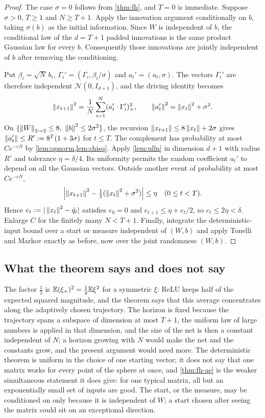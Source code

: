 \begin{proof}
The case $\sigma=0$ follows from \cref{thm:fh}, and $T=0$ is immediate. Suppose $\sigma>0$, $T\ge1$ and $N\ge T+1$. Apply the innovation argument conditionally on $b$, taking $\sigma(b)$ as the initial information. Since $W$ is independent of $b$, the conditional law of the $d=T+1$ padded innovations is the same product Gaussian law for every $b$. Consequently those innovations are jointly independent of $b$ after removing the conditioning.

Put $\beta_i=\sqrt N\,b_i$, $\Gamma_i'=(\Gamma_i,\beta_i/\sigma)$ and $a_t'=(a_t,\sigma)$. The vectors $\Gamma_i'$ are therefore independent $\mathcal N(0,I_{d+1})$, and the driving identity becomes
\[
\left\lVert x_{t+1}\right\rVert^2=\frac1N\sum_{i=1}^N(a_t'\cdot\Gamma_i')_+^2,
\qquad \left\lVert a_t'\right\rVert^2=\left\lVert x_t\right\rVert^2+\sigma^2.
\]
On $\{\left\lVert W\right\rVert_{2\to 2}\le8,\ \left\lVert b\right\rVert^2\le2\sigma^2\}$, the recursion $\left\lVert x_{t+1}\right\rVert\le8\left\lVert x_t\right\rVert+2\sigma$ gives $\left\lVert a_t'\right\rVert\le R':=8^T(1+3\sigma)$ for $t\le T$. The complement has probability at most $Ce^{-cN}$ by \cref{lem:opnorm,lem:chisq}. Apply \cref{lem:ulln} in dimension $d+1$ with radius $R'$ and tolerance $\eta=\delta/4$. Its uniformity permits the random coefficient $a_t'$ to depend on all the Gaussian vectors. Outside another event of probability at most $Ce^{-cN}$,
\[
\left|\left\lVert x_{t+1}\right\rVert^2-\tfrac12(\left\lVert x_t\right\rVert^2+\sigma^2)\right|\le\eta
\quad(0\le t<T).
\]
Hence $e_t:=|\left\lVert x_t\right\rVert^2-\bar q_t|$ satisfies $e_0=0$ and $e_{t+1}\le\eta+e_t/2$, so $e_t\le2\eta<\delta$. Enlarge $C$ for the finitely many $N<T+1$. Finally, integrate the deterministic-input bound over a start or measure independent of $(W,b)$ and apply Tonelli and Markov exactly as before, now over the joint randomness $(W,b)$.
\end{proof}

\subsection{What the theorem says and does not say}

The factor $\tfrac12$ is $\mathbb{E}(\xi_+)^2=\tfrac12\mathbb{E}\xi^2$ for a symmetric $\xi$: ReLU keeps half of the expected squared magnitude, and the theorem says that this average concentrates along the adaptively chosen trajectory. The horizon is fixed because the trajectory spans a subspace of dimension at most $T+1$, the uniform law of large numbers is applied in that dimension, and the size of the net is then a constant independent of $N$; a horizon growing with $N$ would make the net and the constants grow, and the present argument would need more. The deterministic theorem is uniform in the choice of one starting vector; it does not say that one matrix works for every point of the sphere at once, and \cref{thm:fh-ae} is the weaker simultaneous statement it does give: for one typical matrix, all but an exponentially small set of inputs are good. The start, or the measure, may be conditioned on only because it is independent of $W$; a start chosen after seeing the matrix could sit on an exceptional direction.
